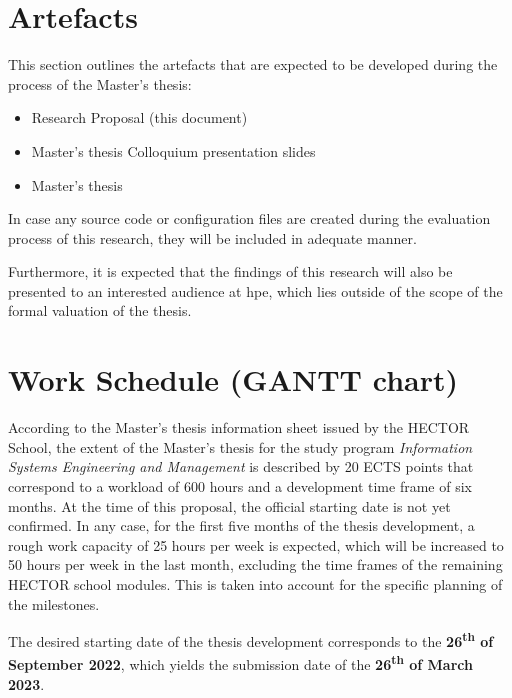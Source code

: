{%

	\section{Artefacts} \label{sec:organization-deliverables}
	This section outlines the artefacts that are expected to be developed during the process of the Master's thesis:
	
	\begin{itemize}
		\item Research Proposal (this document)
		\item Master's thesis Colloquium presentation slides
		\item Master's thesis
	\end{itemize}
	
	In case any source code or configuration files are created during the evaluation process of this research, they will be included in adequate manner.
	
	Furthermore, it is expected that the findings of this research will also be presented to an interested audience at \ac{hpe}, which lies outside of the scope of the formal valuation of the thesis.


	\section{Work Schedule (GANTT chart)} \label{sec:organization-schedule}
	According to the Master's thesis information sheet issued by the HECTOR School, the extent of the Master's thesis for the study program \textit{Information Systems Engineering and Management} is described by 20 ECTS points that correspond to a workload of 600 hours and a development time frame of six months. At the time of this proposal, the official starting date is not yet confirmed. In any case, for the first five months of the thesis development, a rough work capacity of 25 hours per week is expected, which will be increased to 50 hours per week in the last month, excluding the time frames of the remaining HECTOR school modules. This is taken into account for the specific planning of the milestones.
	
	The desired starting date of the thesis development corresponds to the \textbf{26\textsuperscript{th} of September 2022}, which yields the submission date of the \textbf{26\textsuperscript{th} of March 2023}.
	
}
